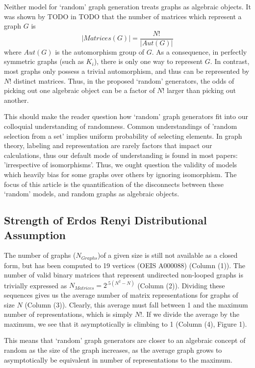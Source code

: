 \documentclass[a4paper,12pt]{article}
\begin{document}
Neither model for `random' graph generation treats graphs as algebraic objects.
It was shown by TODO in TODO that the number of matrices which represent a graph \(G\) is
\[| Matrices(G) | = \frac{N!}{| Aut(G) |}\]
where \(Aut(G)\) is the automorphism group of \(G\).
As a consequence, in perfectly symmetric graphs (such as \(K_i\)), there is only one way to represent \(G\).
In contrast, most graphs only possess a trivial automorphism, and thus can be represented by \(N!\) distinct matrices.
Thus, in the proposed `random' generators, the odds of picking out one algebraic object can be a factor of \(N!\) larger than picking out another. 

This should make the reader question how `random' graph generators fit into our colloquial understanding of randomness.
Common understandings of 'random selection from a set' implies uniform probability of selecting elements.
In graph theory, labeling and representation are rarely factors that impact our calculations, thus our default mode of understanding is found in most papers: 'irrespective of isomorphisms'.
Thus, we ought question the validity of models which heavily bias for some graphs over others by ignoring isomorphism.
The focus of this article is the quantification of the disconnects between these `random' models, and random graphs as algebraic objects.

\subsection*{Strength of Erdos Renyi Distributional Assumption}

The number of graphs (\(N_{Graphs}\))of a given size is still not available as a closed form, but has been computed to 19 vertices (OEIS A000088) (Column (1)).
The number of valid binary matrices that represent undirected non-looped graphs is trivially expressed as \(N_{Matrices} = 2^{.5(N^2 - N)}\) (Column (2)).
Dividing these sequences gives us the average number of matrix representations for graphs of size \(N\) (Column (3)).
Clearly, this average must fall between 1 and the maximum number of representations, which is simply \(N!\).
If we divide the average by the maximum, we see that it asymptotically is climbing to 1 (Column (4), Figure 1).

This means that `random' graph generators are closer to an algebraic concept of random as the size of the graph increases, 
as the average graph grows to asymptotically be equivalent in number of representations to the maximum.
\end{document}
